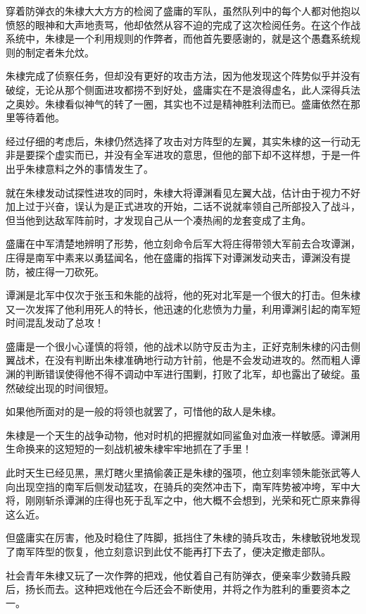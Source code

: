\begin{multicols}{\theparacolNo}
		穿着防弹衣的朱棣大大方方的检阅了盛庸的军队，虽然队列中的每个人都对他抱以愤怒的眼神和大声地责骂，他却依然从容不迫的完成了这次检阅任务。在这个作战系统中，朱棣是一个利用规则的作弊者，而他首先要感谢的，就是这个愚蠢系统规则的制定者朱允炆。

		朱棣完成了侦察任务，但却没有更好的攻击方法，因为他发现这个阵势似乎并没有破绽，无论从那个侧面进攻都捞不到好处，盛庸实在不是浪得虚名，此人深得兵法之奥妙。朱棣看似神气的转了一圈，其实也不过是精神胜利法而已。盛庸依然在那里等待着他。

		经过仔细的考虑后，朱棣仍然选择了攻击对方阵型的左翼，其实朱棣的这一行动无非是要探个虚实而已，并没有全军进攻的意思，但他的部下却不这样想，于是一件出乎朱棣意料之外的事情发生了。

		就在朱棣发动试探性进攻的同时，朱棣大将谭渊看见左翼大战，估计由于视力不好加上过于兴奋，误认为是正式进攻的开始，二话不说就率领自己所部投入了战斗，但当他到达敌军阵前时，才发现自己从一个凑热闹的龙套变成了主角。

		盛庸在中军清楚地辨明了形势，他立刻命令后军大将庄得带领大军前去合攻谭渊，庄得是南军中素来以勇猛闻名，他在盛庸的指挥下对谭渊发动夹击，谭渊没有提防，被庄得一刀砍死。

		谭渊是北军中仅次于张玉和朱能的战将，他的死对北军是一个很大的打击。但朱棣又一次发挥了他利用死人的特长，他迅速的化悲愤为力量，利用谭渊引起的南军短时间混乱发动了总攻！

		盛庸是一个很小心谨慎的将领，他的战术以防守反击为主，正好克制朱棣的闪击侧翼战术，在没有判断出朱棣准确地行动方针前，他是不会发动进攻的。然而粗人谭渊的判断错误使得他不得不调动中军进行围剿，打败了北军，却也露出了破绽。虽然破绽出现的时间很短。

		如果他所面对的是一般的将领也就罢了，可惜他的敌人是朱棣。

		朱棣是一个天生的战争动物，他对时机的把握就如同鲨鱼对血液一样敏感。谭渊用生命换来的这短短的一刻战机被朱棣牢牢地抓在了手里！

		此时天生已经见黑，黑灯瞎火里搞偷袭正是朱棣的强项，他立刻率领朱能张武等人向出现空挡的南军后侧发动猛攻，在骑兵的突然冲击下，南军阵势被冲垮，军中大将，刚刚斩杀谭渊的庄得也死于乱军之中，他大概不会想到，光荣和死亡原来靠得这么近。

		但盛庸实在厉害，他及时稳住了阵脚，抵挡住了朱棣的骑兵攻击，朱棣敏锐地发现了南军阵型的恢复，他立刻意识到此仗不能再打下去了，便决定撤走部队。

		社会青年朱棣又玩了一次作弊的把戏，他仗着自己有防弹衣，便亲率少数骑兵殿后，扬长而去。这种把戏他在今后还会不断使用，并将之作为胜利的重要资本之一。


\end{multicols}
